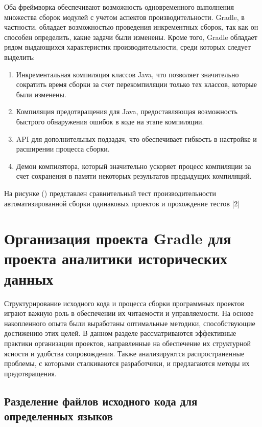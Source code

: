 Оба фреймворка обеспечивают возможность одновременного выполнения множества сборок модулей с учетом
аспектов производительности. Gradle, в частности, обладает возможностью проведения инкрементных
сборок, так как он способен определить, какие задачи были изменены. Кроме того, Gradle обладает
рядом выдающихся характеристик производительности, среди которых следует выделить:
\begin{enumerate}
    \item  Инкрементальная компиляция классов Java, что позволяет значительно сократить время сборки за счет
    перекомпиляции только тех классов, которые были изменены.

    \item Компиляция предотвращения для Java, предоставляющая возможность быстрого обнаружения ошибок в
    коде на этапе компиляции.

    \item API для дополнительных подзадач, что обеспечивает гибкость в настройке и расширении процесса
    сборки.

    \item Демон компилятора, который значительно ускоряет процесс компиляции за счет сохранения в памяти
    некоторых результатов предыдущих компиляций.
\end{enumerate}


На рисунке () представлен сравнительный тест производительности автоматизированной сборки
одинаковых проектов и прохождение тестов [2]


\section{Организация проекта Gradle для проекта аналитики исторических данных}

Структурирование исходного кода и процесса сборки программных проектов играют важную роль в
обеспечении их читаемости и управляемости. На основе накопленного опыта были выработаны оптимальные
методики, способствующие достижению этих целей. В данном разделе рассматриваются эффективные
практики организации проектов, направленные на обеспечение их структурной ясности и удобства
сопровождения. Также анализируются распространенные проблемы, с которыми сталкиваются разработчики,
и предлагаются методы их предотвращения.

\subsection{Разделение файлов исходного кода для определенных языков}

